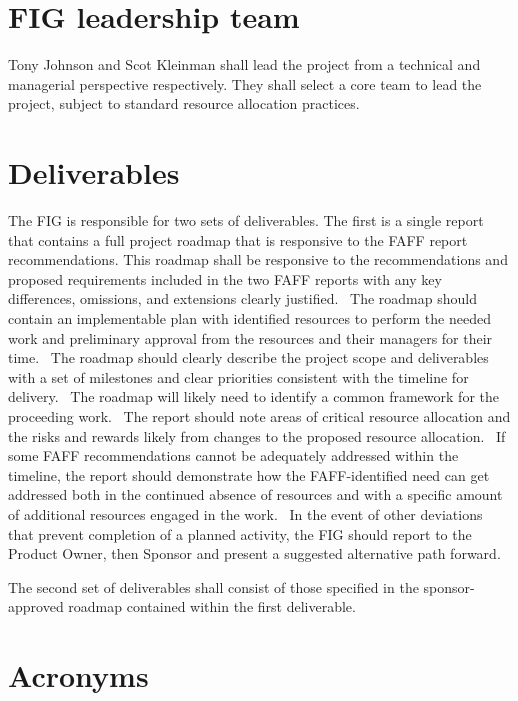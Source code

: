 \documentclass[SE,authoryear,lsstdraft]{lsstdoc}
\begin{document}
\section{FIG leadership team}
Tony Johnson and Scot Kleinman shall lead the project from a technical
and managerial perspective respectively. They shall select a core team
to lead the project, subject to standard resource allocation practices. 


\section{Deliverables}
The FIG is responsible for two sets of deliverables. The first is a
single report that contains a full project roadmap that is responsive to
the FAFF report recommendations. This roadmap shall be responsive to the
recommendations and proposed requirements included in the two FAFF reports
with any key differences, omissions, and extensions clearly justified. 
The roadmap should contain an implementable plan with identified resources
to perform the needed work and preliminary approval from the resources
and their managers for their time.  The roadmap should clearly describe
the project scope and deliverables with a set of milestones and clear
priorities consistent with the timeline for delivery.  The roadmap will
likely need to identify a common framework for the proceeding work.  The
report should note areas of critical resource allocation and the risks
and rewards likely from changes to the proposed resource allocation. 
If some FAFF recommendations cannot be adequately addressed within the
timeline, the report should demonstrate how the FAFF-identified need
can get addressed both in the continued absence of resources and with
a specific amount of additional resources engaged in the work.  In the
event of other deviations that prevent completion of a planned activity,
the FIG should report to the Product Owner, then Sponsor and present a
suggested alternative path forward.


The second set of deliverables shall consist of those specified in the sponsor-approved roadmap contained within the first deliverable. 


\appendix
%

\section{Acronyms} \label{sec:acronyms}

\end{document}
